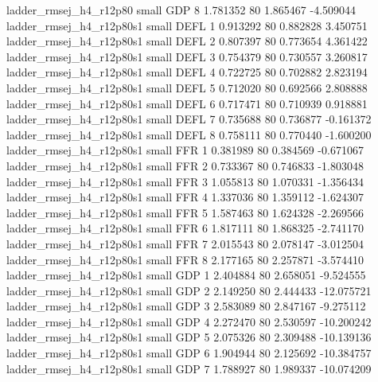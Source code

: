   ladder_rmsej_h4_r12p80      small      GDP                 8 1.781352 80       1.865467          -4.509044
ladder_rmsej_h4_r12p80s1      small     DEFL                 1 0.913292 80       0.882828           3.450751
ladder_rmsej_h4_r12p80s1      small     DEFL                 2 0.807397 80       0.773654           4.361422
ladder_rmsej_h4_r12p80s1      small     DEFL                 3 0.754379 80       0.730557           3.260817
ladder_rmsej_h4_r12p80s1      small     DEFL                 4 0.722725 80       0.702882           2.823194
ladder_rmsej_h4_r12p80s1      small     DEFL                 5 0.712020 80       0.692566           2.808888
ladder_rmsej_h4_r12p80s1      small     DEFL                 6 0.717471 80       0.710939           0.918881
ladder_rmsej_h4_r12p80s1      small     DEFL                 7 0.735688 80       0.736877          -0.161372
ladder_rmsej_h4_r12p80s1      small     DEFL                 8 0.758111 80       0.770440          -1.600200
ladder_rmsej_h4_r12p80s1      small      FFR                 1 0.381989 80       0.384569          -0.671067
ladder_rmsej_h4_r12p80s1      small      FFR                 2 0.733367 80       0.746833          -1.803048
ladder_rmsej_h4_r12p80s1      small      FFR                 3 1.055813 80       1.070331          -1.356434
ladder_rmsej_h4_r12p80s1      small      FFR                 4 1.337036 80       1.359112          -1.624307
ladder_rmsej_h4_r12p80s1      small      FFR                 5 1.587463 80       1.624328          -2.269566
ladder_rmsej_h4_r12p80s1      small      FFR                 6 1.817111 80       1.868325          -2.741170
ladder_rmsej_h4_r12p80s1      small      FFR                 7 2.015543 80       2.078147          -3.012504
ladder_rmsej_h4_r12p80s1      small      FFR                 8 2.177165 80       2.257871          -3.574410
ladder_rmsej_h4_r12p80s1      small      GDP                 1 2.404884 80       2.658051          -9.524555
ladder_rmsej_h4_r12p80s1      small      GDP                 2 2.149250 80       2.444433         -12.075721
ladder_rmsej_h4_r12p80s1      small      GDP                 3 2.583089 80       2.847167          -9.275112
ladder_rmsej_h4_r12p80s1      small      GDP                 4 2.272470 80       2.530597         -10.200242
ladder_rmsej_h4_r12p80s1      small      GDP                 5 2.075326 80       2.309488         -10.139136
ladder_rmsej_h4_r12p80s1      small      GDP                 6 1.904944 80       2.125692         -10.384757
ladder_rmsej_h4_r12p80s1      small      GDP                 7 1.788927 80       1.989337         -10.074209
